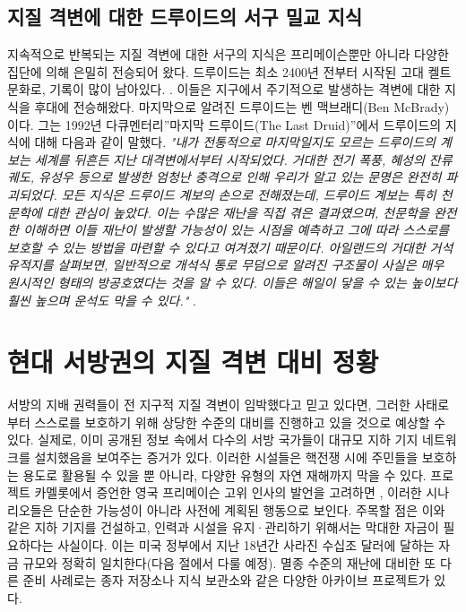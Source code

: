 \documentclass[10pt,twocolumn,letterpaper]{article}
\begin{document}
\subsection{지질 격변에 대한 드루이드의 서구 밀교 지식}

지속적으로 반복되는 지질 격변에 대한 서구의 지식은 프리메이슨뿐만 아니라 다양한 집단에 의해 은밀히 전승되어 왔다. 드루이드는 최소 2400년 전부터 시작된 고대 켈트 문화로, 기록이 많이 남아있다. \cite{7}. 이들은 지구에서 주기적으로 발생하는 격변에 대한 지식을 후대에 전승해왔다. 마지막으로 알려진 드루이드는 벤 맥브래디(Ben McBrady)이다. 그는 1992년 다큐멘터리”마지막 드루이드(The Last Druid)”에서 드루이드의 지식에 대해 다음과 같이 말했다. \textit{"내가 전통적으로 마지막일지도 모르는 드루이드의 계보는 세계를 뒤흔든 지난 대격변에서부터 시작되었다. 거대한 전기 폭풍, 혜성의 잔류 궤도, 유성우 등으로 발생한 엄청난 충격으로 인해 우리가 알고 있는 문명은 완전히 파괴되었다. 모든 지식은 드루이드 계보의 손으로 전해졌는데, 드루이드 계보는 특히 천문학에 대한 관심이 높았다. 이는 수많은 재난을 직접 겪은 결과였으며, 천문학을 완전한 이해하면 이들 재난이 발생할 가능성이 있는 시점을 예측하고 그에 따라 스스로를 보호할 수 있는 방법을 마련할 수 있다고 여겨졌기 때문이다. 아일랜드의 거대한 거석 유적지를 살펴보면, 일반적으로 개석식 통로 무덤으로 알려진 구조물이 사실은 매우 원시적인 형태의 방공호였다는 것을 알 수 있다. 이들은 해일이 닿을 수 있는 높이보다 훨씬 높으며 운석도 막을 수 있다."} \cite{8,9}.
\section{현대 서방권의 지질 격변 대비 정황}

서방의 지배 권력들이 전 지구적 지질 격변이 임박했다고 믿고 있다면, 그러한 사태로부터 스스로를 보호하기 위해 상당한 수준의 대비를 진행하고 있을 것으로 예상할 수 있다. 실제로, 이미 공개된 정보 속에서 다수의 서방 국가들이 대규모 지하 기지 네트워크를 설치했음을 보여주는 증거가 있다. 이러한 시설들은 핵전쟁 시에 주민들을 보호하는 용도로 활용될 수 있을 뿐 아니라, 다양한 유형의 자연 재해까지 막을 수 있다. 프로젝트 카멜롯에서 증언한 영국 프리메이슨 고위 인사의 발언을 고려하면 \cite{4,6}, 이러한 시나리오들은 단순한 가능성이 아니라 사전에 계획된 행동으로 보인다. 주목할 점은 이와 같은 지하 기지를 건설하고, 인력과 시설을 유지·관리하기 위해서는 막대한 자금이 필요하다는 사실이다. 이는 미국 정부에서 지난 18년간 사라진 수십조 달러에 달하는 자금 규모와 정확히 일치한다(다음 절에서 다룰 예정)\cite{11,12,13}. 멸종 수준의 재난에 대비한 또 다른 준비 사례로는 종자 저장소나 지식 보관소와 같은 다양한 아카이브 프로젝트가 있다.
\end{document}
